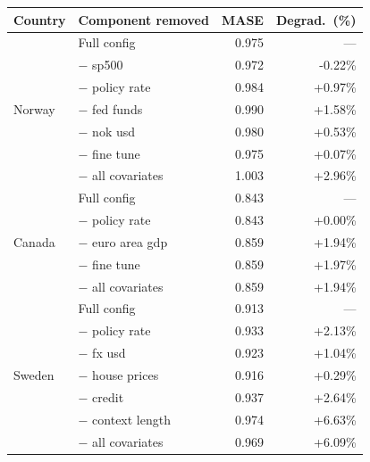 \begin{tabular}{llrr}
\toprule
Country & Component removed & MASE & Degrad.\ (\%) \\
\midrule
\multirow{7}{*}{Norway} & Full config & 0.975 & --- \\
 & $-$ sp500 & 0.972 & -0.22\% \\
 & $-$ policy rate & 0.984 & +0.97\% \\
 & $-$ fed funds & 0.990 & +1.58\% \\
 & $-$ nok usd & 0.980 & +0.53\% \\
 & $-$ fine tune & 0.975 & +0.07\% \\
 & $-$ all covariates & 1.003 & +2.96\% \\
\midrule
\multirow{5}{*}{Canada} & Full config & 0.843 & --- \\
 & $-$ policy rate & 0.843 & +0.00\% \\
 & $-$ euro area gdp & 0.859 & +1.94\% \\
 & $-$ fine tune & 0.859 & +1.97\% \\
 & $-$ all covariates & 0.859 & +1.94\% \\
\midrule
\multirow{7}{*}{Sweden} & Full config & 0.913 & --- \\
 & $-$ policy rate & 0.933 & +2.13\% \\
 & $-$ fx usd & 0.923 & +1.04\% \\
 & $-$ house prices & 0.916 & +0.29\% \\
 & $-$ credit & 0.937 & +2.64\% \\
 & $-$ context length & 0.974 & +6.63\% \\
 & $-$ all covariates & 0.969 & +6.09\% \\
\bottomrule
\end{tabular}
